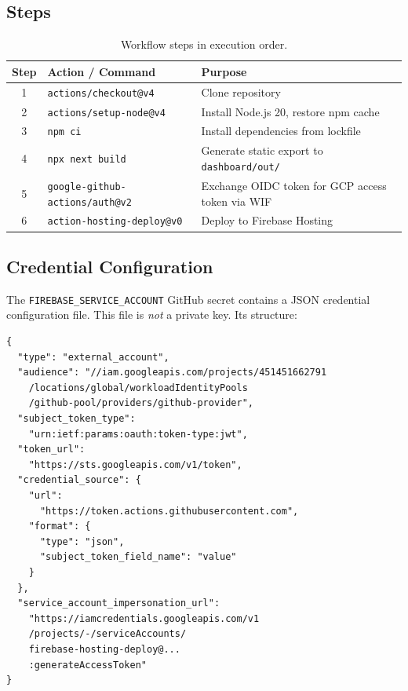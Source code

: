 \documentclass[11pt,a4paper]{article}
\theoremstyle{plainref}
\begin{document}
\subsection{Steps}

\begin{table}[h]
\centering
\caption{Workflow steps in execution order.}
\begin{tabular}{@{}clp{7cm}@{}}
\toprule
\textbf{Step} & \textbf{Action / Command} & \textbf{Purpose} \\
\midrule
1 & \texttt{actions/checkout@v4} & Clone repository \\
2 & \texttt{actions/setup-node@v4} & Install Node.js 20, restore npm cache \\
3 & \texttt{npm ci} & Install dependencies from lockfile \\
4 & \texttt{npx next build} & Generate static export to \texttt{dashboard/out/} \\
5 & \texttt{google-github-actions/auth@v2} & Exchange OIDC token for GCP access token via WIF \\
6 & \texttt{action-hosting-deploy@v0} & Deploy to Firebase Hosting \\
\bottomrule
\end{tabular}
\end{table}

\subsection{Credential Configuration}

The \texttt{FIREBASE\_SERVICE\_ACCOUNT} GitHub secret contains a JSON credential
configuration file. This file is \emph{not} a private key. Its structure:

\begin{verbatim}
{
  "type": "external_account",
  "audience": "//iam.googleapis.com/projects/451451662791
    /locations/global/workloadIdentityPools
    /github-pool/providers/github-provider",
  "subject_token_type":
    "urn:ietf:params:oauth:token-type:jwt",
  "token_url":
    "https://sts.googleapis.com/v1/token",
  "credential_source": {
    "url":
      "https://token.actions.githubusercontent.com",
    "format": {
      "type": "json",
      "subject_token_field_name": "value"
    }
  },
  "service_account_impersonation_url":
    "https://iamcredentials.googleapis.com/v1
    /projects/-/serviceAccounts/
    firebase-hosting-deploy@...
    :generateAccessToken"
}
\end{verbatim}
\end{document}
